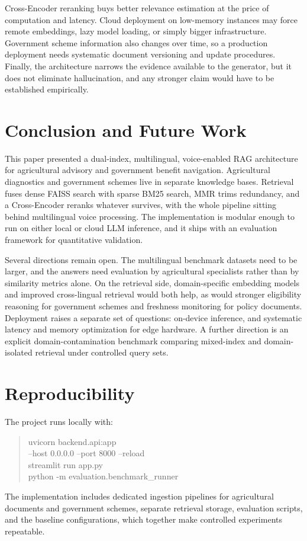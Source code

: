 \documentclass[10pt,twocolumn,letterpaper]{article}
\begin{document}
Cross-Encoder reranking buys better relevance estimation at the price of computation and latency. Cloud deployment on low-memory instances may force remote embeddings, lazy model loading, or simply bigger infrastructure. Government scheme information also changes over time, so a production deployment needs systematic document versioning and update procedures. Finally, the architecture narrows the evidence available to the generator, but it does not eliminate hallucination, and any stronger claim would have to be established empirically.

\section{Conclusion and Future Work}
This paper presented a dual-index, multilingual, voice-enabled RAG architecture for agricultural advisory and government benefit navigation. Agricultural diagnostics and government schemes live in separate knowledge bases. Retrieval fuses dense FAISS search with sparse BM25 search, MMR trims redundancy, and a Cross-Encoder reranks whatever survives, with the whole pipeline sitting behind multilingual voice processing. The implementation is modular enough to run on either local or cloud LLM inference, and it ships with an evaluation framework for quantitative validation.

Several directions remain open. The multilingual benchmark datasets need to be larger, and the answers need evaluation by agricultural specialists rather than by similarity metrics alone. On the retrieval side, domain-specific embedding models and improved cross-lingual retrieval would both help, as would stronger eligibility reasoning for government schemes and freshness monitoring for policy documents. Deployment raises a separate set of questions: on-device inference, and systematic latency and memory optimization for edge hardware. A further direction is an explicit domain-contamination benchmark comparing mixed-index and domain-isolated retrieval under controlled query sets.

\section{Reproducibility}
The project runs locally with:
\begin{quote}\ttfamily\footnotesize
uvicorn backend.api:app\\
\hspace*{1em}--host 0.0.0.0 --port 8000 --reload\\
streamlit run app.py\\
python -m evaluation.benchmark\_runner
\end{quote}
The implementation includes dedicated ingestion pipelines for agricultural documents and government schemes, separate retrieval storage, evaluation scripts, and the baseline configurations, which together make controlled experiments repeatable.
\end{document}
